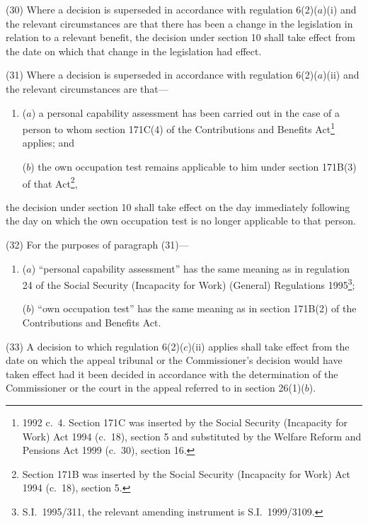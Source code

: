 \documentclass[12pt,a4paper]{article}
\begin{document}
(30) Where a decision is superseded in accordance with regulation 6(2)($a$)(i)  and the relevant circumstances are that there has been a change in the legislation in relation to a relevant benefit, the decision under section 10 shall take effect from the date on which that change in the legislation had effect.

(31) Where a decision is superseded in accordance with regulation 6(2)($a$)(ii)  and the relevant circumstances are that—
\begin{enumerate}\item[]
($a$) a personal capability assessment has been carried out in the case of a person to whom section 171C(4) of the Contributions and Benefits Act\footnote{1992 c.\ 4. Section 171C was inserted by the Social Security (Incapacity for Work) Act 1994 (c.\ 18), section 5 and substituted by the Welfare Reform and Pensions Act 1999 (c.\ 30), section 16.} applies; and

($b$) the own occupation test remains applicable to him under section 171B(3) of that Act\footnote{Section 171B was inserted by the Social Security (Incapacity for Work) Act 1994 (c.\ 18), section 5.},
\end{enumerate}
the decision under section 10 shall take effect on the day immediately following the day on which the own occupation test is no longer applicable to that person.

(32) For the purposes of paragraph (31)—
\begin{enumerate}\item[]
($a$) “personal capability assessment” has the same meaning as in regulation 24 of the Social Security (Incapacity for Work) (General) Regulations 1995\footnote{S.I.\ 1995/311, the relevant amending instrument is S.I.\ 1999/3109.};

($b$) “own occupation test” has the same meaning as in section 171B(2) of the Contributions and Benefits Act.
\end{enumerate}

(33) A decision to which regulation 6(2)($c$)(ii)  applies shall take effect from the date on which the appeal tribunal or the Commissioner’s decision would have taken effect had it been decided in accordance with the determination of the Commissioner or the court in the appeal referred to in section 26(1)($b$).
\end{document}
